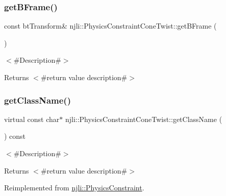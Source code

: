 \subsubsection{\texorpdfstring{get\+B\+Frame()}{getBFrame()}}
{\footnotesize\ttfamily const bt\+Transform\& njli\+::\+Physics\+Constraint\+Cone\+Twist\+::get\+B\+Frame (\begin{DoxyParamCaption}{ }\end{DoxyParamCaption})}

$<$\#\+Description\#$>$

\begin{DoxyReturn}{Returns}
$<$\#return value description\#$>$ 
\end{DoxyReturn}
\mbox{\label{classnjli_1_1_physics_constraint_cone_twist_af65735ee847bd4d4bc72978f52c238ec}} 
\subsubsection{\texorpdfstring{get\+Class\+Name()}{getClassName()}}
{\footnotesize\ttfamily virtual const char$\ast$ njli\+::\+Physics\+Constraint\+Cone\+Twist\+::get\+Class\+Name (\begin{DoxyParamCaption}{ }\end{DoxyParamCaption}) const\hspace{0.3cm}{\ttfamily [virtual]}}

$<$\#\+Description\#$>$

\begin{DoxyReturn}{Returns}
$<$\#return value description\#$>$ 
\end{DoxyReturn}


Reimplemented from \mbox{\hyperlink{classnjli_1_1_physics_constraint_a4d31c5267199972942d66b3480374010}{njli\+::\+Physics\+Constraint}}.

\mbox{\label{classnjli_1_1_physics_constraint_cone_twist_a50abadf06a0a68049c69a905cf09d1c7}} 
